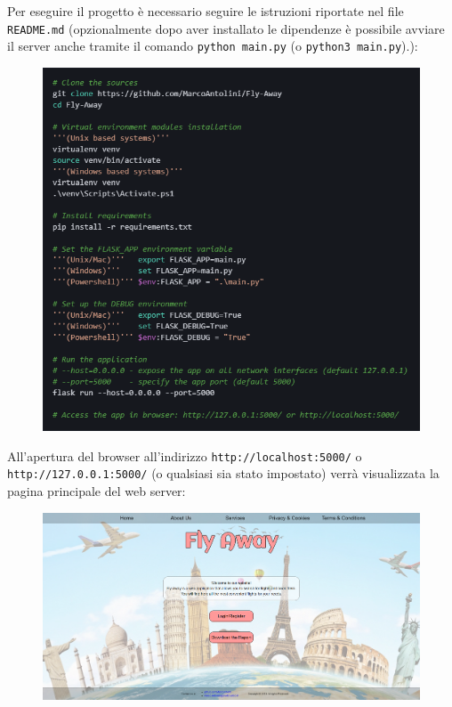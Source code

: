 \documentclass[12pt]{article}
\def\code#1{\texttt{#1}}
\begin{document}
Per eseguire il progetto è necessario seguire le istruzioni riportate nel file \code{README.md} (opzionalmente dopo aver installato le dipendenze è possibile avviare il server anche tramite il comando \code{python main.py} (o \code{python3 main.py}).):
\vskip 0.4cm
\begin{figure}[h]
    \includegraphics[width=13cm]{readme.png}
    \centering
\end{figure}
\vskip 0.7cm
\noindent
All'apertura del browser all'indirizzo \code{http://localhost:5000/} o \code{http://127.0.0.1:5000/} (o qualsiasi sia stato impostato) verrà visualizzata la pagina principale del web server:
\vskip 0.4cm
\begin{figure}[h]
    \includegraphics[width=17cm]{website.png}
    \centering
\end{figure}
\end{document}
